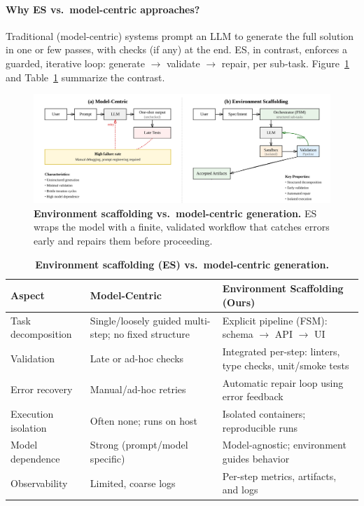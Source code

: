 \documentclass[11pt]{article}
\begin{document}
\paragraph{Why ES vs.\ model-centric approaches?}
Traditional (model-centric) systems prompt an LLM to generate the full solution in one or few passes, with checks (if any) at the end. ES, in contrast, enforces a guarded, iterative loop: generate $\rightarrow$ validate $\rightarrow$ repair, per sub-task. Figure~\ref{fig:es-vs-model} and Table~\ref{tab:es-contrast} summarize the contrast.

\begin{figure}[t]
  \centering
  \includegraphics[width=\linewidth]{diagrams/es-vs-model.png}
  \caption{\textbf{Environment scaffolding vs.\ model-centric generation.} ES wraps the model with a finite, validated workflow that catches errors early and repairs them before proceeding.}
  \label{fig:es-vs-model}
\end{figure}

\begin{table}[t]
\centering
\small
\begin{threeparttable}
\caption{\textbf{Environment scaffolding (ES) vs.\ model-centric generation.}}
\label{tab:es-contrast}
\begin{tabular}{@{}p{3.2cm}p{5.6cm}p{5.6cm}@{}}
\toprule
\textbf{Aspect} & \textbf{Model-Centric} & \textbf{Environment Scaffolding (Ours)} \\
\midrule
Task decomposition & Single/loosely guided multi-step; no fixed structure &
Explicit pipeline (FSM): schema $\rightarrow$ API $\rightarrow$ UI \\
Validation & Late or ad-hoc checks &
Integrated per-step: linters, type checks, unit/smoke tests \\
Error recovery & Manual/ad-hoc retries &
Automatic repair loop using error feedback \\
Execution isolation & Often none; runs on host &
Isolated containers; reproducible runs \\
Model dependence & Strong (prompt/model specific) &
Model-agnostic; environment guides behavior \\
Observability & Limited, coarse logs &
Per-step metrics, artifacts, and logs \\
\bottomrule
\end{tabular}
\end{threeparttable}
\end{table}
\end{document}
